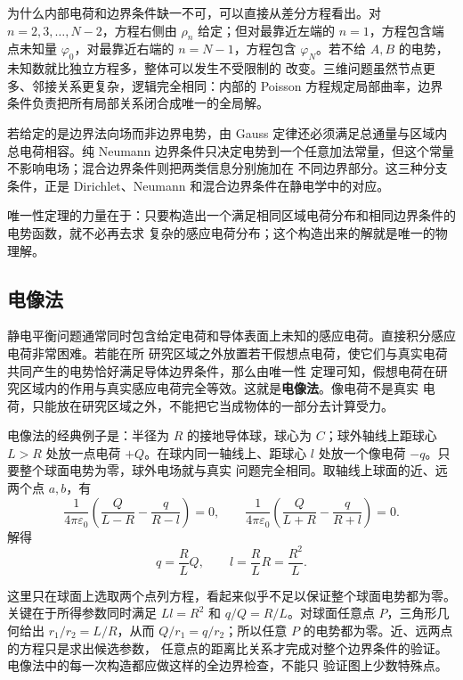 为什么内部电荷和边界条件缺一不可，可以直接从差分方程看出。对 $n=2,3,\ldots,N-2$，方程右侧由
$\rho_n$ 给定；但对最靠近左端的 $n=1$，方程包含端点未知量 $\varphi_0$，对最靠近右端的
$n=N-1$，方程包含 $\varphi_N$。若不给 $A,B$ 的电势，未知数就比独立方程多，整体可以发生不受限制的
改变。三维问题虽然节点更多、邻接关系更复杂，逻辑完全相同：内部的 Poisson 方程规定局部曲率，边界
条件负责把所有局部关系闭合成唯一的全局解。

若给定的是边界法向场而非边界电势，由 Gauss 定律还必须满足总通量与区域内总电荷相容。纯 Neumann
边界条件只决定电势到一个任意加法常量，但这个常量不影响电场；混合边界条件则把两类信息分别施加在
不同边界部分。这三种分支条件，正是 Dirichlet、Neumann 和混合边界条件在静电学中的对应。

唯一性定理的力量在于：只要构造出一个满足相同区域电荷分布和相同边界条件的电势函数，就不必再去求
复杂的感应电荷分布；这个构造出来的解就是唯一的物理解。

\subsection*{电像法}

静电平衡问题通常同时包含给定电荷和导体表面上未知的感应电荷。直接积分感应电荷非常困难。若能在所
研究区域之外放置若干假想点电荷，使它们与真实电荷共同产生的电势恰好满足导体边界条件，那么由唯一性
定理可知，假想电荷在研究区域内的作用与真实感应电荷完全等效。这就是\textbf{电像法}。像电荷不是真实
电荷，只能放在研究区域之外，不能把它当成物体的一部分去计算受力。

电像法的经典例子是：半径为 $R$ 的接地导体球，球心为 $C$；球外轴线上距球心 $L>R$ 处放一点电荷
$+Q$。在球内同一轴线上、距球心 $l$ 处放一个像电荷 $-q$。只要整个球面电势为零，球外电场就与真实
问题完全相同。取轴线上球面的近、远两个点 $a,b$，有
\[
  \frac{1}{4\pi\varepsilon_0}
  \left(\frac{Q}{L-R}-\frac{q}{R-l}\right)=0,
  \qquad
  \frac{1}{4\pi\varepsilon_0}
  \left(\frac{Q}{L+R}-\frac{q}{R+l}\right)=0.
\]
解得
\begin{equation}
  \boxed{q=\frac RLQ,\qquad l=\frac RL R=\frac{R^2}{L}}.
\end{equation}

这里只在球面上选取两个点列方程，看起来似乎不足以保证整个球面电势都为零。关键在于所得参数同时满足
$Ll=R^2$ 和 $q/Q=R/L$。对球面任意点 $P$，三角形几何给出
$r_1/r_2=L/R$，从而 $Q/r_1=q/r_2$；所以任意 $P$ 的电势都为零。近、远两点的方程只是求出候选参数，
任意点的距离比关系才完成对整个边界条件的验证。电像法中的每一次构造都应做这样的全边界检查，不能只
验证图上少数特殊点。

